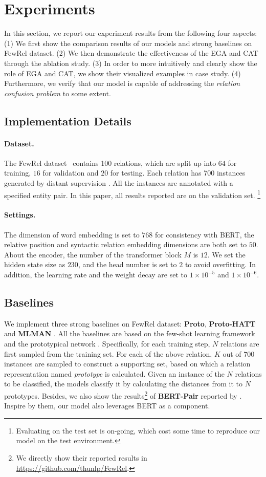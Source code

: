 \documentclass[11pt]{article}
\begin{document}
\section{Experiments}
In this section, we report our experiment results from the following four aspects: 
(1) We first show the comparison results of our models and strong baselines on FewRel dataset.
(2) We then demonstrate the effectiveness of the EGA and CAT through the ablation study.
(3) In order to more intuitively and clearly show the role of EGA and CAT, we show their visualized examples in case study.
(4) Furthermore, we verify that our model is capable of addressing the \textit{relation confusion problem} to some extent.


\subsection{Implementation Details}
\paragraph{Dataset.} 
The FewRel dataset~\cite{Han2018FewRel} contains 100 relations, which are split up into $64$ for training, $16$ for validation and $20$ for testing. 
Each relation has 700 instances generated by distant supervision \cite{mintz2009distant}. 
All the instances are annotated with a  specified entity pair. In this paper, all results reported are on the validation set. \footnote{Evaluating on the test set is on-going, which cost some time to reproduce our model on the test environment.}
\paragraph{Settings.}

The dimension of word embedding is set to $768$ for consistency with BERT, the relative position and syntactic relation embedding dimensions are both set to $50$. 
About the encoder, the number of the transformer block $M$ is $12$. We set the hidden state size as $230$, and the head number is set to $2$ to avoid overfitting. 
In addition, the learning rate and the weight decay are set to $1\times 10^{-5}$ and $1\times 10^{-6}$.  %
\subsection{Baselines}
We implement {{three}} strong baselines on FewRel dataset: \textbf{Proto}, \textbf{Proto-HATT} \cite{gao2019hybrid} and \textbf{MLMAN} \cite{YeMulti}.
All the baselines are based on the few-shot learning framework and the prototypical network \cite{snell2017prototypical}.
Specifically, for each training step, $N$ relations are first sampled from the training set.
For each of the above relation, $K$ out of 700 instances are sampled to construct a supporting set, based on which a relation representation named \textit{prototype} is calculated.
Given an instance of the $N$ relations to be classified, the models classify it by calculating the distances from it to $N$ prototypes.
Besides, we also show the results\footnote{We directly show their reported results in \url{https://github.com/thunlp/FewRel}. } of \textbf{BERT-Pair} reported by .
Inspire by them, our model also leverages BERT as a component.
\end{document}
